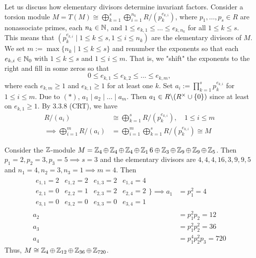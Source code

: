 \documentclass[11pt]{book}
\theoremstyle{definition}   \newtheorem{defn}[counter]{Definition} %
\newcommand{\bs}{\backslash}   \newcommand{\A}{\mathcal{A}}   \newcommand{\sy}{\textnormal{Syl}}   \newcommand{\size}[1]{\left| #1 \right|}
\newcommand{\vs}{\vspace{8pt}}
\numberwithin{counter}{chapter}
\begin{document}
\begin{remark}[+ Discussion]
Let us discuss how elementary divisors determine invariant factors. Consider a torsion module $M = T(M) \cong \bigoplus_{k=1}^s \bigoplus_{i=1}^{n_k} R/(p_k^{e_{k,i}})$, where $p_1,\dots,p_s \in R$ are nonassociate primes, each $n_k \in \operatorname{\mathbb{N}}$, and $1 \leq e_{k,1} \leq \dots \leq e_{k,n_k}$ for all $1 \leq k \leq s$. This means that $(p_k^{e_{k,i}} \mid 1 \leq k \leq s, 1 \leq i \leq n_k)$ are the elementary divisors of $M$. We set $m := \max \{n_k \mid 1 \leq k \leq s\}$ and renumber the exponents so that each $e_{k,i} \in \operatorname{\mathbb{N}}_0$ with $1 \leq k \leq s$ and $1 \leq i \leq m$. That is, we "shift" the exponents to the right and fill in some zeros so that
	\[0 \leq e_{k,1} \leq e_{k,2} \leq \dots \leq e_{k,m} \tag{$\ast$}, \]
where each $e_{k,m} \geq 1$ and $e_{k,1} \geq 1$ for at least one $k$. Set $a_i := \prod_{k=1}^s p_k ^{e_{k,i}}$ for $1 \leq i \leq m$. Due to $(\ast)$, $a_1 \mid a_2 \mid \dots \mid a_m$. Then $a_1 \in R \bs (R\x \cup \{0\})$ since at least on $e_{k,1} \geq 1$. By 3.3.8 (CRT), we have
\begin{align*}
R/(a_i) &\cong \bigoplus_{k=1}^s R/(p_k^{e_{k,i}}), \quad 1 \leq i \leq m \\
\implies \bigoplus_{i=1}^m R/(a_i) &= \bigoplus_{i=1}^m \bigoplus_{k=1}^s R/(p_k^{e_{k,i}}) \cong M
\end{align*}
\end{remark}

\vs

\begin{example*}
Consider the $\operatorname{\mathbb{Z}}$-module $M = \operatorname{\mathbb{Z}}_4 \oplus \operatorname{\mathbb{Z}}_4 \oplus \operatorname{\mathbb{Z}}_4 \oplus \operatorname{\mathbb{Z}}_16 \oplus \operatorname{\mathbb{Z}}_3 \oplus \operatorname{\mathbb{Z}}_9 \oplus \operatorname{\mathbb{Z}}_9 \oplus \operatorname{\mathbb{Z}}_5$. Then $p_1 = 2, p_2 = 3, p_3 = 5 \implies s=3$ and the elementary divisors are $4,4,4,16,3,9,9,5$ and $n_1 = 4, n_2 = 3, n_3 = 1 \implies m = 4$. Then
\begin{align*}
\begin{array}{rrrr}
e_{1,1} = 2 & e_{1,2} = 2 & e_{1,3} = 2 & e_{1,4} = 4 \\
e_{2,1} = 0 & e_{2,2} = 1 & e_{2,3} = 2 & e_{2,4} = 2 \\
e_{3,1} = 0 & e_{3,2} = 0 & e_{3,3} = 0 & e_{3,4} = 1
\end{array} \Bigg\} \implies a_1 &= p_1^2 = 4 \\
a_2 &= p_1^2 p_2 = 12 \\
a_3 &= p_1^2 p_2^2 = 36 \\
a_4 &= p_1^4 p_2^2 p_3 = 720
\end{align*}
Thus, $M \cong \operatorname{\mathbb{Z}}_4 \oplus \operatorname{\mathbb{Z}}_{12} \oplus \operatorname{\mathbb{Z}}_{36} \oplus \operatorname{\mathbb{Z}}_{720}$.
\end{example*}
\end{document}
